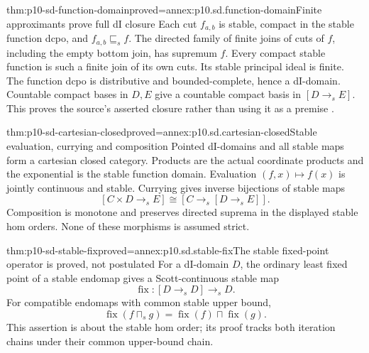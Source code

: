 \begin{hbtheorem}{thm:p10-sd-function-domain}{proved=annex:p10.sd.function-domain}{Finite approximants prove full dI closure}
Each cut \(f_{a,b}\) is stable, compact in the stable function dcpo,
and \(f_{a,b}\sqsubseteq_s f\). The directed family of finite joins
of cuts of \(f\), including the empty bottom join, has supremum \(f\).
Every compact stable function is such a finite join of its own cuts.
Its stable principal ideal is finite. The function dcpo is distributive
and bounded-complete, hence a dI-domain.
Countable compact bases in \(D,E\) give a countable compact basis in
\([D\longrightarrow_s E]\). This proves the source's asserted
closure rather than using it as a premise
\cite[p.~36]{Gunter1994TypesAuthorOA}.
\end{hbtheorem}

\begin{hbtheorem}{thm:p10-sd-cartesian-closed}{proved=annex:p10.sd.cartesian-closed}{Stable evaluation, currying and composition}
Pointed dI-domains and all stable maps form a cartesian closed category.
Products are the actual coordinate products and the exponential is the
stable function domain. Evaluation \((f,x)\mapsto f(x)\) is jointly
continuous and stable. Currying gives inverse bijections of stable maps
\[
 [C\times D\longrightarrow_s E]
       \cong[C\longrightarrow_s[D\longrightarrow_s E]].
\]
Composition is monotone and preserves directed suprema in the displayed
stable hom orders. None of these morphisms is assumed strict.
\end{hbtheorem}

\begin{hbtheorem}{thm:p10-sd-stable-fix}{proved=annex:p10.sd.stable-fix}{The stable fixed-point operator is proved, not postulated}
For a dI-domain \(D\), the ordinary least fixed point of a stable
endomap gives a Scott-continuous stable map
\[
 \operatorname{fix}:[D\longrightarrow_s D]\longrightarrow_s D.
\]
For compatible endomaps with common stable upper bound,
\[
 \operatorname{fix}(f\sqcap_s g)
       =\operatorname{fix}(f)\sqcap\operatorname{fix}(g).
\]
This assertion is about the stable hom order; its proof tracks both
iteration chains under their common upper-bound chain.
\end{hbtheorem}


